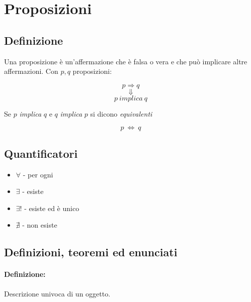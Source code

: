 \section{Proposizioni}
    \subsection{Definizione}
        Una proposizione è un'affermazione che è falsa o vera e che può implicare altre affermazioni.
        Con $p, q$ proposizioni:

        \begin{LARGE}
            \begin{equation*}
                p \Rightarrow q
            \end{equation*}
        \begin{equation*}
              \Downarrow
        \end{equation*}
        \begin{equation*}
              p\ implica\ q
        \end{equation*}
        \end{LARGE}
        Se $p$ \textit{implica} $q$ e $q$ \textit{implica} $p$ si dicono \textit{equivalenti}\newline
        \begin{LARGE}
            \begin{equation*}
                p\ \iff\ q
            \end{equation*}
        \end{LARGE}
        \subsection{Quantificatori}
            \begin{itemize}
                \item $\forall$ - per ogni
                \item $\exists$ - esiste
                \item $\exists!$ - esiste ed è unico
                \item $\nexists$ - non esiste
            \end{itemize}
        \subsection{Definizioni, teoremi ed enunciati}
        \paragraph{Definizione:\\ }
            Descrizione univoca di un oggetto.
